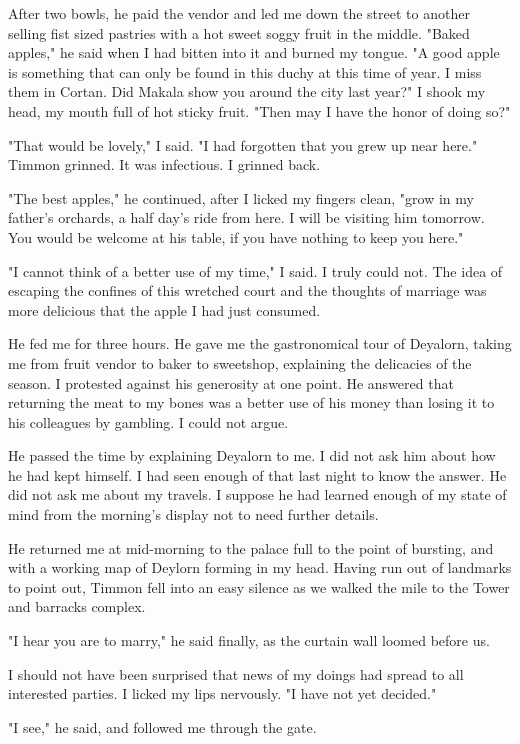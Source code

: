 \documentclass{article}
\begin{document}
After two bowls, he paid the vendor and led me down the street to another selling fist sized pastries with a hot sweet soggy fruit in the middle. "Baked apples," he said when I had bitten into it and burned my tongue. "A good apple is something that can only be found in this duchy at this time of year. I miss them in Cortan. Did Makala show you around the city last year?" I shook my head, my mouth full of hot sticky fruit. "Then may I have the honor of doing so?"

"That would be lovely," I said. "I had forgotten that you grew up near here." Timmon grinned. It was infectious. I grinned back.

"The best apples," he continued, after I licked my fingers clean, "grow in my father's orchards, a half day's ride from here. I will be visiting him tomorrow. You would be welcome at his table, if you have nothing to keep you here."

"I cannot think of a better use of my time," I said. I truly could not. The idea of escaping the confines of this wretched court and the thoughts of marriage was more delicious that the apple I had just consumed.

He fed me for three hours. He gave me the gastronomical tour of Deyalorn, taking me from fruit vendor to baker to sweetshop, explaining the delicacies of the season. I protested against his generosity at one point. He answered that returning the meat to my bones was a better use of his money than losing it to his colleagues by gambling. I could not argue.

He passed the time by explaining Deyalorn to me. I did not ask him about how he had kept himself. I had seen enough of that last night to know the answer. He did not ask me about my travels. I suppose he had learned enough of my state of mind from the morning's display not to need further details. 

He returned me at mid-morning to the palace full to the point of bursting, and with a working map of Deylorn forming in my head. Having run out of landmarks to point out, Timmon fell into an easy silence as  we walked the mile to the Tower and barracks complex. 

"I hear you are to marry," he said finally, as the curtain wall loomed before us.

I should not have been surprised that news of my doings had spread to all interested parties. I licked my lips nervously. "I have not yet decided."

"I see," he said, and followed me through the gate.
\end{document}
